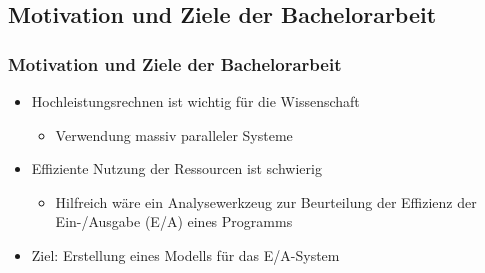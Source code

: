 \documentclass{beamer}
\begin{document}
\subsection{Motivation und Ziele der Bachelorarbeit}
\begin{frame}
	\frametitle{Motivation und Ziele der Bachelorarbeit}
	\begin{itemize}
		\item Hochleistungsrechnen ist wichtig für die Wissenschaft
		\begin{itemize}
			\item Verwendung massiv paralleler Systeme
		\end{itemize}	
		\item Effiziente Nutzung der Ressourcen ist schwierig
		\begin{itemize}
			\item Hilfreich wäre ein Analysewerkzeug zur Beurteilung der Effizienz der Ein-/Ausgabe (E/A) eines Programms
		\end{itemize}			
	\end{itemize}
	\begin{itemize}
		\item Ziel: Erstellung eines Modells für das E/A-System
	\end{itemize}	
\end{frame}
\end{document}
